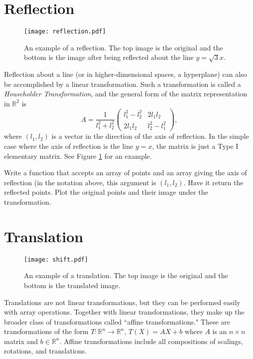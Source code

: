 \section*{Reflection}
\begin{figure}
\centering
\texttt{[image: reflection.pdf]}
\caption{An example of a reflection.
The top image is the original and the bottom is the image after
being reflected about the line $y = \sqrt{3}x$.}
\label{basis:reflection}
\end{figure}
Reflection about a line (or in higher-dimensional spaces, a hyperplane) can also be
accomplished by a linear transformation. Such a transformation is called a
\emph{Householder Transformation}, and the general form of the matrix representation in
$\mathbb{R}^2$ is
\[
A = \frac{1}{l_1^2 + l_2^2}
\begin{pmatrix}
l_1^2 - l_2^2 & 2l_1l_2 \\
2l_1l_2 & l_2^2 - l_1^2
\end{pmatrix},
\]
where $(l_1, l_2)$ is a vector in the direction of the axis of reflection. In the simple
case where the axis of reflection is the line $y=x$, the matrix is just a Type I elementary
matrix. See Figure \ref{basis:reflection} for an example.

\begin{problem}
Write a function that accepts an array of points and an array giving the axis of
reflection (in the notation above, this argument is $(l_1, l_2)$.
Have it return the reflected points.
Plot the original points and their image under the transformation.
\end{problem}

\section*{Translation}

\begin{figure}
\centering
\texttt{[image: shift.pdf]}
\caption{
An example of a translation.
The top image is the original and the bottom is the translated image.}
\label{basis:translation}
\end{figure}

Translations are not linear transformations, but they can be performed easily with array operations.
Together with linear transformations, they make up the broader class of transformations called
``affine transformations."
These are transformations of the form $T: \mathbb{R}^n \to \mathbb{R}^n$, $T(X) = AX + b$ where $A$ is
an $n\times n$ matrix and $b \in \mathbb{R}^n$.
Affine transformations include all compositions of scalings, rotations, and translations.


